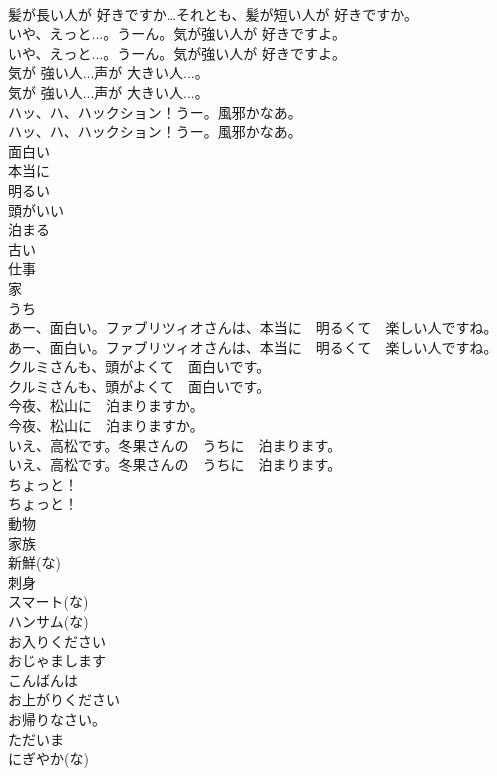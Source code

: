 \documentclass[8pt]{extreport}
\begin{document}
\begin{CJK}{UTF8}{min}
\\	髪が長い人が 好きですか…それとも、髪が短い人が 好きですか。 
\\	いや、えっと...。うーん。気が強い人が 好きですよ。	
\\	いや、えっと...。うーん。気が強い人が 好きですよ。 
\\	気が 強い人...声が 大きい人...。	
\\	気が 強い人...声が 大きい人...。 
\\	ハッ、ハ、ハックション！うー。風邪かなあ。	
\\	ハッ、ハ、ハックション！うー。風邪かなあ。 
\\	面白い
\\	本当に
\\	明るい
\\	頭がいい
\\	泊まる
\\	古い
\\	仕事
\\	家
\\	うち
\\	あー、面白い。ファブリツィオさんは、本当に　明るくて　楽しい人ですね。	
\\	あー、面白い。ファブリツィオさんは、本当に　明るくて　楽しい人ですね。 
\\	クルミさんも、頭がよくて　面白いです。	
\\	クルミさんも、頭がよくて　面白いです。 
\\	今夜、松山に　泊まりますか。	
\\	今夜、松山に　泊まりますか。 
\\	いえ、高松です。冬果さんの　うちに　泊まります。	
\\	いえ、高松です。冬果さんの　うちに　泊まります。 
\\	ちょっと！	
\\	ちょっと！ 
\\	動物
\\	家族
\\	新鮮(な)
\\	刺身
\\	スマート(な)
\\	ハンサム(な)
\\	お入りください
\\	おじゃまします
\\	こんばんは
\\	お上がりください
\\	お帰りなさい。
\\	ただいま
\\	にぎやか(な)

\end{CJK}
\end{document}
